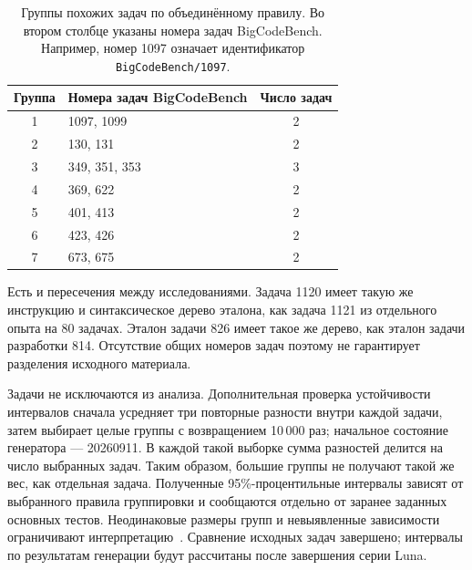 \begin{table}[htbp]\centering
\caption{Группы похожих задач по объединённому правилу. Во втором столбце указаны номера задач BigCodeBench. Например, номер 1097 означает идентификатор \texttt{BigCodeBench/1097}.}
\label{tab:source-groups}
\begin{tabular}{clc}\toprule
Группа & Номера задач BigCodeBench & Число задач\\\midrule
1 & 1097, 1099 & 2\\
2 & 130, 131 & 2\\
3 & 349, 351, 353 & 3\\
4 & 369, 622 & 2\\
5 & 401, 413 & 2\\
6 & 423, 426 & 2\\
7 & 673, 675 & 2\\\bottomrule
\end{tabular}
\end{table}

Есть и пересечения между исследованиями. Задача 1120 имеет такую же инструкцию и синтаксическое дерево эталона, как задача 1121 из отдельного опыта на 80 задачах. Эталон задачи 826 имеет такое же дерево, как эталон задачи разработки 814. Отсутствие общих номеров задач поэтому не гарантирует разделения исходного материала.

Задачи не исключаются из анализа. Дополнительная проверка устойчивости интервалов сначала усредняет три повторные разности внутри каждой задачи, затем выбирает целые группы с возвращением 10\,000 раз; начальное состояние генератора --- 20260911. В каждой такой выборке сумма разностей делится на число выбранных задач. Таким образом, большие группы не получают такой же вес, как отдельная задача. Полученные 95\%-процентильные интервалы зависят от выбранного правила группировки и сообщаются отдельно от заранее заданных основных тестов. Неодинаковые размеры групп и невыявленные зависимости ограничивают интерпретацию~\cite{mackinnon2023clusters}. Сравнение исходных задач завершено; интервалы по результатам генерации будут рассчитаны после завершения серии Luna.

